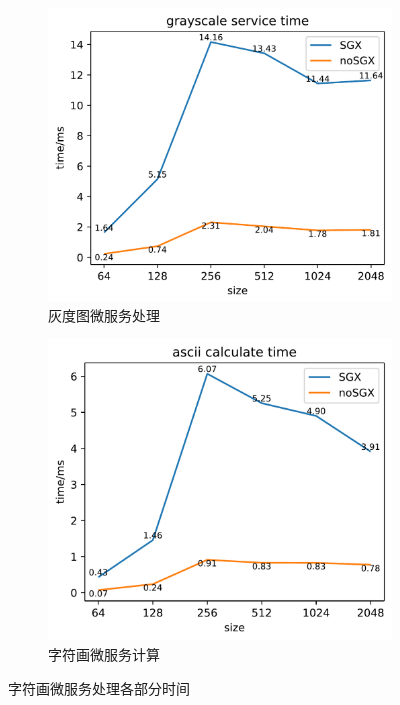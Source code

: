 \begin{figure}[!ht]
\begin{subfigure}{0.32\textwidth}
    \end{subfigure}
    \begin{subfigure}{0.32\textwidth}
        \centering
        \includegraphics[width=\textwidth]{figures/grayscale_service.pdf}
        \caption{灰度图微服务处理}
    \end{subfigure}
    \begin{subfigure}{0.32\textwidth}
        \centering
        \includegraphics[width=\textwidth]{figures/ascii_cal.pdf}
        \caption{字符画微服务计算}
    \end{subfigure}
    \caption{字符画微服务处理各部分时间}
    \label{fig:evaluation-ascii}
\end{figure}

